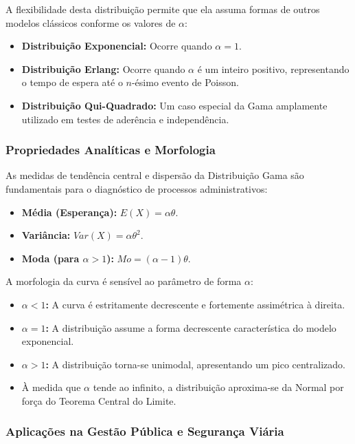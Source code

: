 A flexibilidade desta distribuição permite que ela assuma formas de outros modelos clássicos conforme os valores de $\alpha$:

\begin{itemize}
\item \textbf{Distribuição Exponencial:} Ocorre quando $\alpha = 1$.
\item \textbf{Distribuição Erlang:} Ocorre quando $\alpha$ é um inteiro positivo, representando o tempo de espera até o $n$-ésimo evento de Poisson.
\item \textbf{Distribuição Qui-Quadrado:} Um caso especial da Gama amplamente utilizado em testes de aderência e independência.
\end{itemize}

\newpage
\subsubsection{Propriedades Analíticas e Morfologia}As medidas de tendência central e dispersão da Distribuição Gama são fundamentais para o diagnóstico de processos administrativos:

\begin{itemize}
\item \textbf{Média (Esperança):} $E(X) = \alpha \theta$.
\item \textbf{Variância:} $Var(X) = \alpha \theta^2$.
\item \textbf{Moda (para $\alpha > 1$):} $Mo = (\alpha - 1)\theta$.
\end{itemize}

A morfologia da curva é sensível ao parâmetro de forma $\alpha$:

\begin{itemize}
\item \textbf{$\alpha < 1$:} A curva é estritamente decrescente e fortemente assimétrica à direita.
\item \textbf{$\alpha = 1$:} A distribuição assume a forma decrescente característica do modelo exponencial.
\item \textbf{$\alpha > 1$:} A distribuição torna-se unimodal, apresentando um pico centralizado.
\item À medida que $\alpha$ tende ao infinito, a distribuição aproxima-se da Normal por força do Teorema Central do Limite.
\end{itemize}

\subsubsection{Aplicações na Gestão Pública e Segurança Viária}

